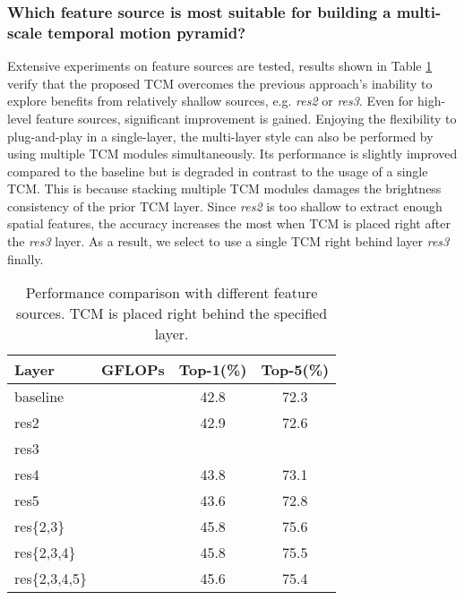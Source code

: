 \documentclass[journal]{IEEEtran}
\begin{document}
\subsubsection{Which feature source is most suitable for building a multi-scale temporal motion pyramid?}
Extensive experiments on feature sources are tested, results shown in Table \ref{tab:featuresource} verify that the proposed TCM overcomes the previous approach's inability to explore benefits from relatively shallow sources, e.g. \textit{res2} or \textit{res3}. Even for high-level feature sources, significant improvement is gained. Enjoying the flexibility to plug-and-play in a single-layer, the multi-layer style can also be performed by using multiple TCM modules simultaneously. Its performance is slightly improved compared to the baseline but is degraded in contrast to the usage of a single TCM. This is because stacking multiple TCM modules damages the brightness consistency of the prior TCM layer. Since \textit{res2} is too shallow to extract enough spatial features, the accuracy increases the most when TCM is placed right after the \textit{res3} layer. As a result, we select to use a single TCM right behind layer \textit{res3} finally.
\begin{table}[!htbp]
\centering
\caption{Performance comparison with different feature sources. TCM is placed right behind the specified layer.}
\label{tab:featuresource}
\begin{tabular}{l|c|c|c}
\hline Layer & GFLOPs & Top-1(\%) & Top-5(\%) \\
\hline baseline &  & 42.8 & 72.3 \\ \hline
res2 &  & 42.9 & 72.6 \\
res3 &  &  &  \\
res4 &  & 43.8 & 73.1 \\
res5 &  & 43.6 & 72.8 \\
res\{2,3\} &  & 45.8 & 75.6 \\
res\{2,3,4\} &  & 45.8 & 75.5 \\
res\{2,3,4,5\} &  & 45.6 & 75.4 \\
\hline
\end{tabular}
\end{table}
\end{document}
